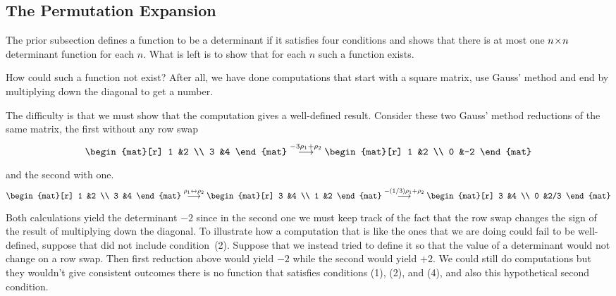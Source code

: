 \subsection{The Permutation Expansion}
The prior subsection defines a function to be a determinant if it
satisfies four conditions and
shows that there is at most one $n \! \times \! n$ determinant function for
each $n$.
What is left is to show that for each $n$ such a function exists.

How could such a function not exist?
After all, we have done computations that start with a square matrix,
use Gauss' method and end by multiplying down the diagonal to
get a number.

The difficulty is that we must show that 
the computation gives a well-defined result.
Consider these two Gauss' method reductions
of the same matrix, the first without any row swap
\begin{equation*}
  \begin{mat}[r]
    1  &2  \\
    3  &4
  \end{mat}
  \grstep{-3\rho_1+\rho_2}
  \begin{mat}[r]
    1  &2  \\
    0  &-2
  \end{mat}
\end{equation*}
and the second with one.
\begin{equation*}
  \begin{mat}[r]
    1  &2  \\
    3  &4
  \end{mat}
  \grstep{\rho_1\leftrightarrow\rho_2}
  \begin{mat}[r]
    3  &4  \\
    1  &2
  \end{mat}
  \grstep{-(1/3)\rho_1+\rho_2}
  \begin{mat}[r]
    3  &4  \\
    0  &2/3
  \end{mat}
\end{equation*}
Both
calculations yield the determinant $-2$ 
since in the second one
we must keep track of the fact that the row swap changes the sign of the result
of multiplying down the diagonal.
To illustrate how a computation that is like the ones that we are doing could 
fail to be well-defined, 
suppose that  did not include condition~(2). 
Suppose that we instead tried to define it so that
the value of a determinant would not change on a row swap.
Then first reduction above would
yield $-2$ while the second would yield $+2$.
We could still do computations but they wouldn't give consistent outcomes\Dash
there is no 
function that satisfies conditions (1), (2), and (4), and also this
hypothetical second condition. 

